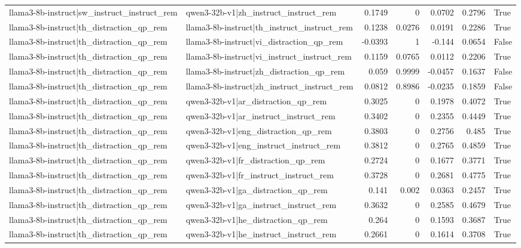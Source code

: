 \begin{table}
\begin{tabular}{l l r r r r l}
llama3-8b-instruct|sw_instruct_instruct_rem & qwen3-32b-v1|zh_instruct_instruct_rem & 0.1749 & 0 & 0.0702 & 0.2796 & True \\
llama3-8b-instruct|th_distraction_qp_rem & llama3-8b-instruct|th_instruct_instruct_rem & 0.1238 & 0.0276 & 0.0191 & 0.2286 & True \\
llama3-8b-instruct|th_distraction_qp_rem & llama3-8b-instruct|vi_distraction_qp_rem & -0.0393 & 1 & -0.144 & 0.0654 & False \\
llama3-8b-instruct|th_distraction_qp_rem & llama3-8b-instruct|vi_instruct_instruct_rem & 0.1159 & 0.0765 & 0.0112 & 0.2206 & True \\
llama3-8b-instruct|th_distraction_qp_rem & llama3-8b-instruct|zh_distraction_qp_rem & 0.059 & 0.9999 & -0.0457 & 0.1637 & False \\
llama3-8b-instruct|th_distraction_qp_rem & llama3-8b-instruct|zh_instruct_instruct_rem & 0.0812 & 0.8986 & -0.0235 & 0.1859 & False \\
llama3-8b-instruct|th_distraction_qp_rem & qwen3-32b-v1|ar_distraction_qp_rem & 0.3025 & 0 & 0.1978 & 0.4072 & True \\
llama3-8b-instruct|th_distraction_qp_rem & qwen3-32b-v1|ar_instruct_instruct_rem & 0.3402 & 0 & 0.2355 & 0.4449 & True \\
llama3-8b-instruct|th_distraction_qp_rem & qwen3-32b-v1|eng_distraction_qp_rem & 0.3803 & 0 & 0.2756 & 0.485 & True \\
llama3-8b-instruct|th_distraction_qp_rem & qwen3-32b-v1|eng_instruct_instruct_rem & 0.3812 & 0 & 0.2765 & 0.4859 & True \\
llama3-8b-instruct|th_distraction_qp_rem & qwen3-32b-v1|fr_distraction_qp_rem & 0.2724 & 0 & 0.1677 & 0.3771 & True \\
llama3-8b-instruct|th_distraction_qp_rem & qwen3-32b-v1|fr_instruct_instruct_rem & 0.3728 & 0 & 0.2681 & 0.4775 & True \\
llama3-8b-instruct|th_distraction_qp_rem & qwen3-32b-v1|ga_distraction_qp_rem & 0.141 & 0.002 & 0.0363 & 0.2457 & True \\
llama3-8b-instruct|th_distraction_qp_rem & qwen3-32b-v1|ga_instruct_instruct_rem & 0.3632 & 0 & 0.2585 & 0.4679 & True \\
llama3-8b-instruct|th_distraction_qp_rem & qwen3-32b-v1|he_distraction_qp_rem & 0.264 & 0 & 0.1593 & 0.3687 & True \\
llama3-8b-instruct|th_distraction_qp_rem & qwen3-32b-v1|he_instruct_instruct_rem & 0.2661 & 0 & 0.1614 & 0.3708 & True \\

\end{tabular}
\end{table}
